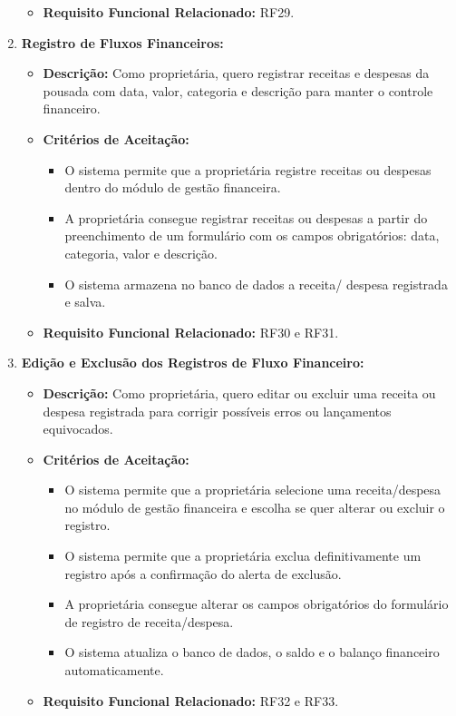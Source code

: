 \documentclass[
	12pt,				%
	openany,			%
	oneside,			%
	a4paper,			%
	english,			%
	french,				%
	spanish,			%
	brazil				%
	]{abntex2}
\begin{document}
\begin{enumerate}[label=\textbf{\arabic*.}]
\begin{itemize}
		\item \textbf{Requisito Funcional Relacionado:} RF29.
	\end{itemize} 
	\item \textbf{Registro de Fluxos Financeiros:}
	\begin{itemize}
		\item \textbf{Descrição:} Como proprietária, quero registrar receitas e despesas da pousada com data, valor, categoria e descrição para manter o controle financeiro. 
		\item \textbf{Critérios de Aceitação:}
		\begin{itemize}
			\item O sistema permite que a proprietária registre receitas ou despesas dentro do módulo de gestão financeira.
			\item A proprietária consegue registrar receitas ou despesas a partir do preenchimento de um formulário com os campos obrigatórios: data, categoria, valor e descrição.
			\item O sistema armazena no banco de dados a receita/ despesa registrada e salva.
		\end{itemize}
		\item \textbf{Requisito Funcional Relacionado:} RF30 e RF31.
	\end{itemize} 
	\item \textbf{Edição e Exclusão dos Registros de Fluxo Financeiro:}
	\begin{itemize}
		\item \textbf{Descrição:} Como proprietária, quero editar ou excluir uma receita ou despesa registrada para corrigir possíveis erros ou lançamentos equivocados.
		\item \textbf{Critérios de Aceitação:}
		\begin{itemize}
			\item O sistema permite que a proprietária selecione uma receita/despesa no módulo de gestão financeira e escolha se quer alterar ou excluir o registro.
			\item O sistema permite que a proprietária exclua definitivamente um registro após a confirmação do alerta de exclusão.
			\item A proprietária consegue alterar os campos obrigatórios do formulário de registro de receita/despesa.
			\item O sistema atualiza o banco de dados, o saldo e o balanço financeiro automaticamente. 
		\end{itemize}
		\item \textbf{Requisito Funcional Relacionado:} RF32 e RF33.

\end{itemize}
\end{enumerate}
\end{document}
